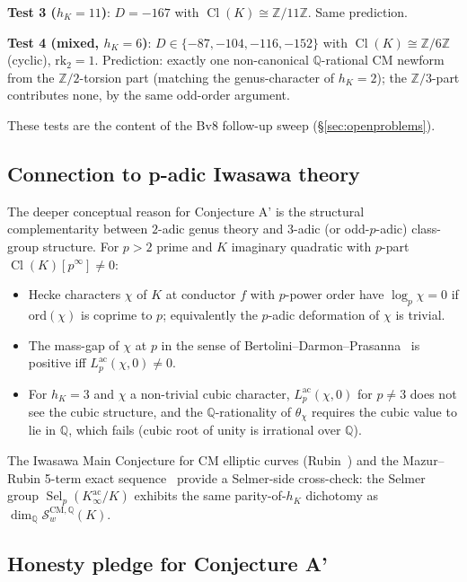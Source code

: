 \documentclass[11pt,a4paper]{amsart}
\theoremstyle{definition}
\DeclareMathOperator{\Cl}{Cl}
\DeclareMathOperator{\Sel}{Sel}
\newcommand{\Q}{\mathbb{Q}}
\newcommand{\Z}{\mathbb{Z}}
\newcommand{\Scal}{\mathcal{S}}
\newcommand{\hK}{h_{K}}
\newcommand{\rktwo}{\mathrm{rk}_2}
\begin{document}
\textbf{Test 3 ($\hK = 11$)}: $D = -167$ with $\Cl(K) \cong \Z/11\Z$. Same prediction.

\textbf{Test 4 (mixed, $\hK = 6$)}: $D \in \{-87, -104, -116, -152\}$ with $\Cl(K) \cong \Z/6\Z$ (cyclic), $\rktwo = 1$. Prediction: exactly one non-canonical $\Q$-rational CM newform from the $\Z/2$-torsion part (matching the genus-character of $\hK = 2$); the $\Z/3$-part contributes none, by the same odd-order argument.

These tests are the content of the Bv8 follow-up sweep (\S\ref{sec:openproblems}).

\subsection{Connection to p-adic Iwasawa theory}\label{sec:conjA-prime-p-adic}

The deeper conceptual reason for Conjecture A' is the structural complementarity between $2$-adic genus theory and $3$-adic (or odd-$p$-adic) class-group structure. For $p > 2$ prime and $K$ imaginary quadratic with $p$-part $\Cl(K)[p^\infty] \ne 0$:
\begin{itemize}[leftmargin=2em]
  \item Hecke characters $\chi$ of $K$ at conductor $f$ with $p$-power order have $\log_p \chi = 0$ if $\mathrm{ord}(\chi)$ is coprime to $p$; equivalently the $p$-adic deformation of $\chi$ is trivial.
  \item The mass-gap of $\chi$ at $p$ in the sense of Bertolini--Darmon--Prasanna~\cite{BDP2013} is positive iff $L_p^{\mathrm{ac}}(\chi, 0) \ne 0$.
  \item For $\hK = 3$ and $\chi$ a non-trivial cubic character, $L_p^{\mathrm{ac}}(\chi, 0)$ for $p \ne 3$ does not see the cubic structure, and the $\Q$-rationality of $\theta_\chi$ requires the cubic value to lie in $\Q$, which fails (cubic root of unity is irrational over $\Q$).
\end{itemize}
The Iwasawa Main Conjecture for CM elliptic curves (Rubin~\cite{Rubin1991}) and the Mazur--Rubin 5-term exact sequence~\cite{MazurRubin2004} provide a Selmer-side cross-check: the Selmer group $\Sel_p(K_\infty^{\mathrm{ac}}/K)$ exhibits the same parity-of-$\hK$ dichotomy as $\dim_\Q \Scal_w^{\mathrm{CM},\Q}(K)$.

\subsection{Honesty pledge for Conjecture A'}\label{sec:conjA-prime-honesty}
\end{document}
